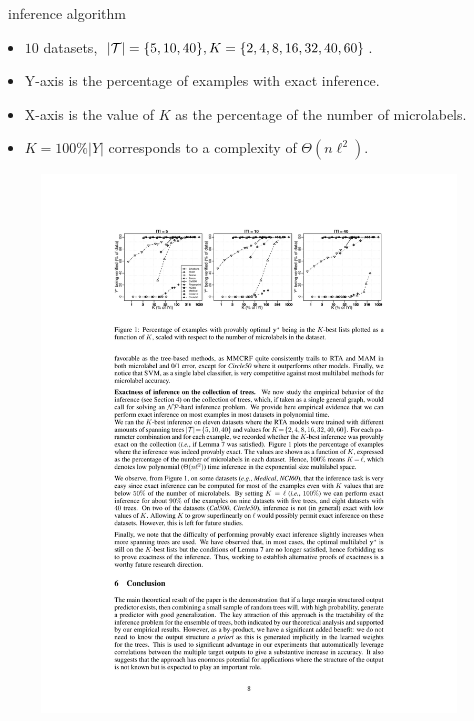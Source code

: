 \documentclass[first=dgreen,second=purple,logo=red]{aaltoslides}
\begin{document}
%
\begin{frame}{\rta\ inference algorithm}
	\begin{itemize}\footnotesize
		\item $10$ datasets, $|\mathcal{T}| = \{5,10,40\}, K=\{2,4,8,16,32,40,60\}$.
		\item Y-axis is the percentage of examples with exact inference.
		\item X-axis is the value of $K$ as the percentage of the number of microlabels.
		\item $K=100\%|Y|$ corresponds to a complexity of $\Theta(n\ell^2)$.
	\end{itemize}
	\begin{figure}
		\begin{center}
			\includegraphics[width=11cm]{./result_plot.pdf}
		\end{center}
	\end{figure}
\end{frame}
\end{document}
